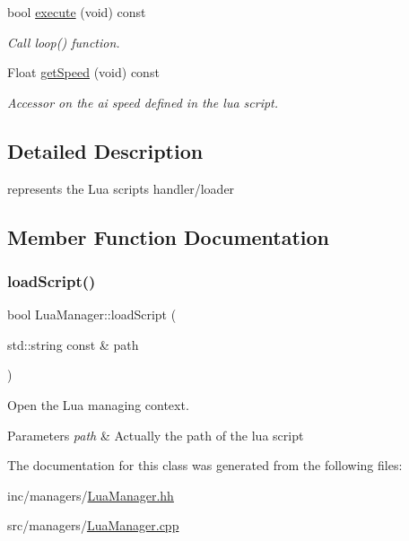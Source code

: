 \begin{DoxyCompactItemize}
\mbox{\label{classLuaManager_af9bdb289e5e90cf610164d7254795b4a}} 
bool \hyperlink{classLuaManager_af9bdb289e5e90cf610164d7254795b4a}{execute} (void) const
\begin{DoxyCompactList}\small\item\em Call loop() function. \end{DoxyCompactList}\item 
\mbox{\label{classLuaManager_aa8ebbf62ccc4cb4de1fbc5403c53afc6}} 
Float \hyperlink{classLuaManager_aa8ebbf62ccc4cb4de1fbc5403c53afc6}{get\+Speed} (void) const
\begin{DoxyCompactList}\small\item\em Accessor on the ai speed defined in the lua script. \end{DoxyCompactList}\end{DoxyCompactItemize}


\subsection{Detailed Description}
represents the Lua scripts handler/loader 

\subsection{Member Function Documentation}
\mbox{\label{classLuaManager_a113433dbaed2e770ed510610de8b6c4f}} 
\subsubsection{\texorpdfstring{load\+Script()}{loadScript()}}
{\footnotesize\ttfamily bool Lua\+Manager\+::load\+Script (\begin{DoxyParamCaption}\item[{std\+::string const \&}]{path }\end{DoxyParamCaption})}



Open the Lua managing context. 


\begin{DoxyParams}{Parameters}
{\em path} & Actually the path of the lua script \\
\hline
\end{DoxyParams}


The documentation for this class was generated from the following files\+:\begin{DoxyCompactItemize}
\item 
inc/managers/\hyperlink{LuaManager_8hh}{Lua\+Manager.\+hh}\item 
src/managers/\hyperlink{LuaManager_8cpp}{Lua\+Manager.\+cpp}\end{DoxyCompactItemize}
